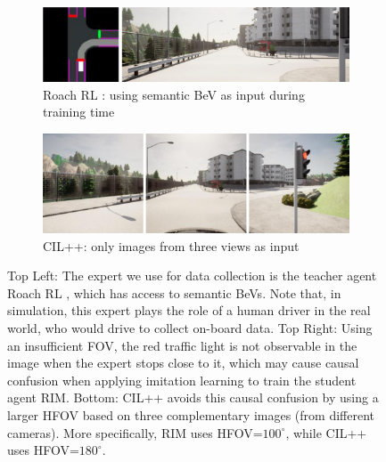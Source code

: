 \begin{figure}
	\centering
	\begin{subfigure}[b]{\linewidth}
		\centering
		\includegraphics[width=\textwidth]{fig/TLCausalConfusionA.png}
		\caption{Roach RL \cite{Zhang:2021}: using semantic BeV as input during training time}
		\label{fig:TLCausualConfusionB}
	\end{subfigure}
	\hfill
	\begin{subfigure}[b]{\linewidth}
		\centering
		\includegraphics[width=\textwidth]{fig/TLCausalConfusionB.png}
		\caption{CIL++: only images from three views as input}
		\label{fig:TLCausualConfusionA}
	\end{subfigure}
	\caption{Top Left: The expert we use for data collection is the teacher agent Roach RL \cite{Zhang:2021}, which has access to semantic BeVs. 
		Note that, in simulation, this expert plays the role of a human driver in the real world, who would drive to collect on-board data. 
		Top Right: Using an insufficient FOV, the red traffic light is not observable in the image when the expert stops close to it, which may cause causal confusion when applying imitation learning to train the student agent RIM. 
		Bottom: CIL++ avoids this causal confusion by using a larger HFOV based on three complementary images (from different cameras). More specifically, RIM uses HFOV=$100^{\circ}$, while CIL++ uses HFOV=$180^{\circ}$.}
	\label{fig:causalconfusion}
\end{figure}


